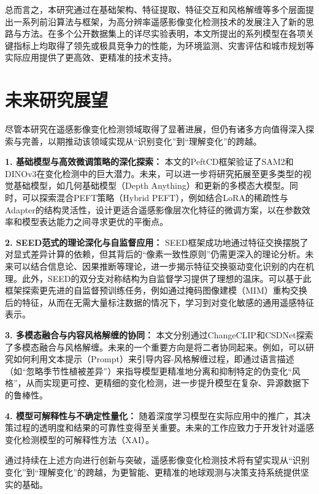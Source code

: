 总而言之，本研究通过在基础架构、特征提取、特征交互和风格解缠等多个层面提出一系列前沿算法与框架，为高分辨率遥感影像变化检测技术的发展注入了新的思路与方法。在多个公开数据集上的详尽实验表明，本文所提出的系列模型在各项关键指标上均取得了领先或极具竞争力的性能，为环境监测、灾害评估和城市规划等实际应用提供了更高效、更精准的技术支持。

\section{未来研究展望}

尽管本研究在遥感影像变化检测领域取得了显著进展，但仍有诸多方向值得深入探索与完善，以期推动该领域实现从“识别变化”到“理解变化”的跨越。

\textbf{1. 基础模型与高效微调策略的深化探索：} 本文的PeftCD框架验证了SAM2和DINOv3在变化检测中的巨大潜力。未来，可以进一步将研究拓展至更多类型的视觉基础模型，如几何基础模型（Depth Anything）和更新的多模态大模型。同时，可以探索混合PEFT策略（Hybrid PEFT），例如结合LoRA的稀疏性与Adapter的结构灵活性，设计更适合遥感影像层次化特征的微调方案，以在参数效率和模型表达能力之间寻求更优的平衡点。

\textbf{2. SEED范式的理论深化与自监督应用：} SEED框架成功地通过特征交换摆脱了对显式差异计算的依赖，但其背后的“像素一致性原则”仍需更深入的理论分析。未来可以结合信息论、因果推断等理论，进一步揭示特征交换驱动变化识别的内在机理。此外，SEED的双分支对称结构为自监督学习提供了理想的温床。可以基于此框架探索更先进的自监督预训练任务，例如通过掩码图像建模（MIM）重构交换后的特征，从而在无需大量标注数据的情况下，学习到对变化敏感的通用遥感特征表示。

\textbf{3. 多模态融合与内容风格解缠的协同：} 本文分别通过ChangeCLIP和CSDNet探索了多模态融合与风格解缠。未来的一个重要方向是将二者协同起来。例如，可以研究如何利用文本提示（Prompt）来引导内容-风格解缠过程，即通过语言描述（如“忽略季节性植被差异”）来指导模型更精准地分离和抑制特定的伪变化“风格”，从而实现更可控、更精细的变化检测，进一步提升模型在复杂、异源数据下的鲁棒性。

\textbf{4. 模型可解释性与不确定性量化：} 随着深度学习模型在实际应用中的推广，其决策过程的透明度和结果的可靠性变得至关重要。未来的工作应致力于开发针对遥感变化检测模型的可解释性方法（XAI）。

通过持续在上述方向进行创新与突破，遥感影像变化检测技术将有望实现从“识别变化”到“理解变化”的跨越，为更智能、更精准的地球观测与决策支持系统提供坚实的基础。
